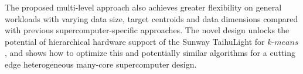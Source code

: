 \documentclass[10pt,journal,compsoc]{IEEEtran}
\begin{document}
The proposed multi-level approach also achieves greater flexibility on general workloads with varying data size, target centroids and data dimensions compared with previous supercomputer-specific approaches.  The novel design unlocks the potential of hierarchical hardware support of the Sunway TaihuLight for $k$-$means$, and shows how to optimize this and potentially similar algorithms for a cutting edge heterogeneous many-core supercomputer design.














\end{document}
